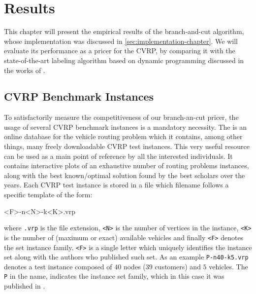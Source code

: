 \chapter{Results}
\label{sec:results}

This chapter will present the empirical results
of the branch-and-cut algorithm,
whose implementation was discussed in \cref{sec:implementation-chapter}.
We will evaluate its performance as a pricer for the CVRP,
by comparing it with
the state-of-the-art labeling algorithm based on dynamic programming
discussed in the works of \textcite{pessoa2020generic, sadykov2021bucket}.

\medskip

\section{CVRP Benchmark Instances}
\label{sec:results-benchmark-instances}
To satisfactorily measure the competitiveness of our branch-an-cut pricer,
the usage of several CVRP benchmark instances is a mandatory necessity.
The 
is an online database for the vehicle routing problem
which it contains, among other things,
many freely downloadable CVRP test instances.
This very useful resource can be used
as a main point of reference by all the interested individuals.
It contains interactive plots of an exhaustive number of routing problems instances,
along with the best known/optimal solution found by the best scholars over the years.
Each CVRP test instance is stored in a file which filename follows a specific template of the form:

\begin{center}
	\begin{LVerbatim}
		<F>-n<N>-k<K>.vrp
	\end{LVerbatim}
\end{center}

where \texttt{.vrp} is the file extension,
\texttt{<N>} is the number of vertices in the instance,
\texttt{<K>} is the number of (maximum or exact) available vehicles
and finally \texttt{<F>} denotes the set instance family.
\texttt{<F>} is a single letter which uniquely identifies the instance
set along with the authors who published such set.
As an example \texttt{P-n40-k5.vrp} denotes a test instance composed
of $40$ nodes ($39$ customers) and $5$ vehicles.
The \texttt{P} in the name, indicates the instance set family, which in this
case it was published in \textcite{augerat1995}.

